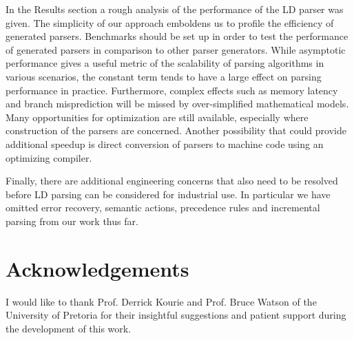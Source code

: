 \documentclass[envcountsame,runningheads]{llncs}
\begin{document}
In the Results section a rough analysis of the performance of the LD parser was given.
The simplicity of our approach emboldens us to profile the efficiency of generated parsers.
Benchmarks should be set up in order to test the performance of generated parsers in comparison to other parser generators.
While asymptotic performance gives a useful metric of the scalability of parsing algorithms in various scenarios, the constant term tends to have a large effect on parsing performance in practice.
Furthermore, complex effects such as memory latency and branch misprediction will be missed by over-simplified mathematical models.
Many opportunities for optimization are still available, especially where construction of the parsers are concerned.
Another possibility that could provide additional speedup is direct conversion of parsers to machine code using an optimizing compiler.

Finally, there are additional engineering concerns that also need to be resolved before LD parsing can be considered for industrial use.
In particular we have omitted error recovery, semantic actions, precedence rules and incremental parsing from our work thus far.


\section*{Acknowledgements}
I would like to thank Prof. Derrick Kourie and Prof. Bruce Watson of the University of Pretoria for their insightful suggestions and patient support during the development of this work.



\end{document}
